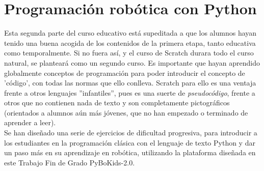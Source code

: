 \section{Programación robótica con Python}\label{sec:Python}
Esta segunda parte del curso educativo está supeditada a que los alumnos hayan tenido una buena acogida de los contenidos de la primera etapa, tanto educativa como temporalmente. Si no fuera así, y el curso de Scratch durara todo el curso natural, se planteará como un segundo curso. Es importante que hayan aprendido globalmente conceptos de programación para poder introducir el concepto de 'código', con todas las normas que ello conlleva. Scratch para ello es una ventaja frente a otros lenguajes ''infantiles'', pues es una suerte de \textit{pseudocódigo}, frente a otros que no contienen nada de texto y son completamente pictográficos (orientados a alumnos aún más jóvenes, que no han empezado o terminado de aprender a leer). \\
Se han diseñado una serie de ejercicios de dificultad progresiva, para introducir a los estudiantes en la programación clásica con el lenguaje de texto Python y dar un paso más en su aprendizaje en robótica, utilizando la plataforma diseñada en este Trabajo Fin de Grado PyBoKids-2.0.
